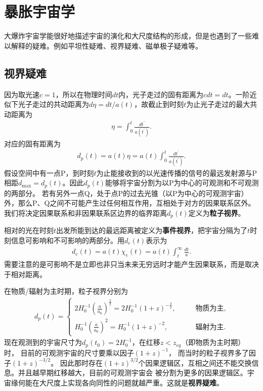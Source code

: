 \section{暴胀宇宙学}
大爆炸宇宙学能很好地描述宇宙的演化和大尺度结构的形成，但是也遇到了一些难以解释的疑难。例如平坦性疑难、视界疑难、磁单极子疑难等。

\subsection{视界疑难}
因为取光速$c=1$，所以在物理时间$dt$内，光子走过的固有距离为$cdt=dt$。一阶近似下光子走过的共动距离为$d\eta=dt
/a(t)$，故截止到时刻$t$为止光子走过的最大共动距离为
\begin{align}
  \label{eq:conformal_time}
  \eta = \int_0^{t} \frac{dt^{\prime}}{a(t^{\prime})}.
\end{align}
对应的固有距离为
\begin{align}
  \label{eq:particle_horizon}
  d_{p}(t) = a(t)\eta=a(t)\int_0^{t}\frac{dt^{\prime}}{a(t^{\prime})}.
\end{align}
假设空间中有一点P，到时刻$t$为止能接收到的以光速传播的信号的最远发射源与P相距$d_{\text{max}}=d_{p}(t)$。因此$d_{p}(t)$能够将宇宙分割为以P为中心的可观测和不可观测的两部分。
若有另外一点Q，处于点P的过去光锥（以P为中心的可观测宇宙）外，那么P、Q之间不可能产生过任何相互作用，互相处于对方的因果联系区外。我们将决定因果联系和非因果联系区边界的临界距离$d_{p}(t)$定义为\textbf{粒子视界}。

相对的光在时刻$t$出发所能到达的最远距离被定义为\textbf{事件视界}，把宇宙分隔为了$t$时刻信息可影响和不可影响的两部分。用$d_e(t)$表示为
\begin{align}
  d_e(t) = a(t)\chi_e(t) = a(t)\int_t^{\infty}\frac{dt}{a}.
\end{align}
需要注意的是可影响不是立即也非只当未来无穷远时才能产生因果联系，而是取决于相对距离。

在物质/辐射为主时期，粒子视界分别为
\begin{align}
  \label{eq:particle_horizon_matter}
  d_p(t) =
  \begin{cases}
    2H_0^{-1}{\left(\frac{a}{a_0}\right)}^{\frac{3}{2}} =
    2H_0^{-1}{\left(1+z\right)}^{-\frac{3}{2}},\qquad&\text{物质为主},\\
    H_0^{-1}{\left(\frac{a}{a_0}\right)}^2=H_0^{-1}{\left(1+z\right)}^{-2},\qquad&\text{辐射为主}.
  \end{cases}
\end{align}
现在观测到的宇宙尺寸为$d_p(t_0)=2H_0^{-1}$，在红移$z < z_{eq}$（即物质为主时期）时，
目前的可观测宇宙的尺寸要乘以因子${\left(1+z\right)}^{-1}$，
而当时的粒子视界多了因子${\left(1+z\right)}^{-3 /2}$。
因此那时存在${\left(1+z\right)}^{3/2}$个因果逻辑区，互相之间还不能交换信息。并且越早期红移越大，目前的可观测宇宙会
被分割为更多的因果逻辑区。宇宙缘何能在大尺度上实现各向同性的问题就越严重。这就是\textbf{视界疑难}。

